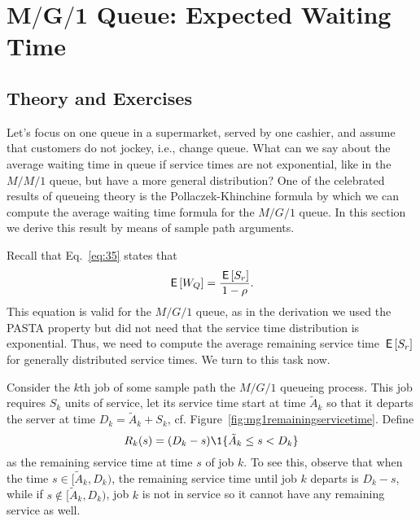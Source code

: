 \section
[$M/G/1$ Queue: Expected Waiting Time]
{$\mathbf{M/G/1}$ Queue: Expected Waiting Time}
\label{sec:mg1}


\subsection*{Theory and Exercises}



Let's focus on one queue in a supermarket, served by one cashier, and
assume that customers do not jockey, i.e., change queue. What can we
say about the average waiting time in queue if service times are not
exponential, like in the $M/M/1$ queue, but have a more general
distribution? One of the celebrated results of queueing theory is the
Pollaczek-Khinchine formula by which we can compute the average
waiting time formula for the $M/G/1$ queue. In this section we derive
this result by means of sample path arguments.

Recall that Eq.~\eqref{eq:35} states that
\begin{equation*}
  \,\mathsf{E}\left[W_Q\right] = \frac{\,\mathsf{E}\left[S_r\right]}{1-\rho}.
\end{equation*}
This equation is valid for the $M/G/1$ queue, as in the derivation we
used the PASTA property but did not need that the
service time distribution is exponential. Thus, we need to compute the average remaining service time $\,\mathsf{E}\left[S_r\right]$ for generally distributed service times. We turn to this task now.

Consider the $k$th job of some sample path the $M/G/1$ queueing
process. This job requires $S_k$ units of service, let its service
time start at time $\tilde A_k$ so that it departs the server at time
$D_k=\tilde A_k + S_k$, cf. Figure~\ref{fig:mg1remainingservicetime}. Define
\begin{equation*}
R_k(s) = (D_k-s)\1{\tilde A_k \leq s < D_k}
\end{equation*}
as the remaining service time at time $s$ of job $k$. To see this,
observe that when the time $s\in [\tilde A_k, D_k)$, the remaining service
time until job $k$ departs is $D_k-s $, while if
$s\not \in [\tilde A_k, D_k)$, job $k$ is not in service so it cannot have
any remaining service as well.

